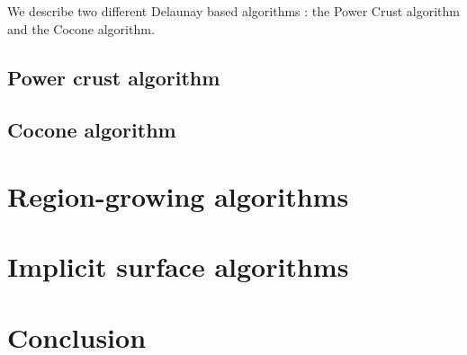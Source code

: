 \documentclass[a4paper]{article}
\begin{document}
We describe two different Delaunay based algorithms : the Power Crust algorithm and the Cocone algorithm.
\subsection{Power crust algorithm}

\subsection{Cocone algorithm}

\section{Region-growing algorithms}

\section{Implicit surface algorithms}


\section{Conclusion}
\end{document}
